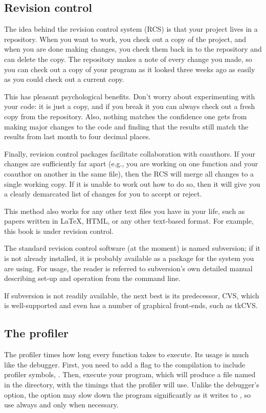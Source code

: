 \documentclass[12pt]{article}
\def\ind#1{\index{#1}#1}
\begin{document}
\subsection{Revision control}  \label{valgrind}
The idea behind the revision control system (RCS) is that your project
lives in a repository. When you want to work, you check out
a copy of the project, and when you are done making changes, you check
them back in to the repository and can delete the copy.  The repository
makes a note of every change you made, so you can check out a copy of
your program as it looked three weeks ago as easily as you could check
out a current copy.

This has pleasant psychological benefits. Don't worry about experimenting
with your code: it is just a copy, and if you break it you can always check
out a fresh copy from the repository. Also, nothing matches the confidence
one gets from making major changes to the code and finding that the
results still match the results from last month to four decimal places.

Finally, revision control packages facilitate collaboration with
coauthors. If your changes are sufficiently far apart (e.g., you are
working on one function and your coauthor on another in the same file),
then the RCS will merge all changes to a single working copy. If
it is unable to work out how to do so, then it will give you a
clearly demarcated list of changes for you to accept or reject.

This method also works for any other text files you have in your
life, such as papers written in \LaTeX, HTML, or any other text-based
format. For example, this book is under revision control.

The standard revision control software (at the moment) is named
subversion; if it is not already installed, it is probably available as
a package for the system you are using. For usage, the reader is referred
to subversion's own detailed manual describing set-up and operation from
the command line.

If subversion is not readily available, the next best is its predecessor,
CVS, which is well-supported and even has a number of graphical
front-ends, such as tkCVS.  

\subsection{The \ind{profiler}} The profiler times how long every function
takes to execute. Its usage is much like the debugger. First, you need
to add a flag to the compilation to include profiler symbols,
. Then, execute your program, which will produce a file named
 in the directory, with the timings that the profiler
will use. Unlike the debugger's  option, the 
option may slow down the program significantly as it writes to
, so use  always and  only
when necessary.
\end{document}
